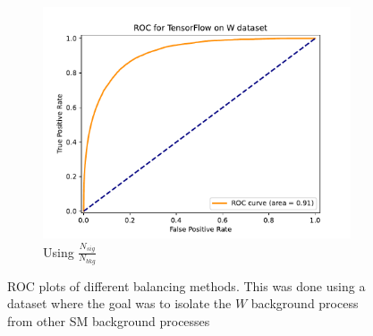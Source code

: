 \documentclass[12pt, a4paper]{book}
\begin{document}
\begin{figure}[!ht]
\begin{subfigure}[b]{0.49\textwidth}
         \centering
         \includegraphics[width=1\textwidth]{Balanced/ROC.pdf}
         \caption{Using $\frac{N_{sig}}{N_{bkg}}$}\label{fig:WROCW}
      \end{subfigure}
      \caption[ROC plots for different balancing methods on NN]{ROC plots of different balancing methods. 
      This was done using a dataset where the goal was to isolate the $W$ background process from other SM background processes}\label{fig:WROC}
\end{figure}
\clearpage
\end{document}
